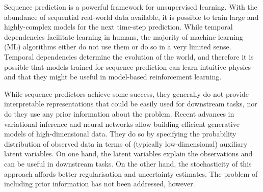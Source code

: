 %
    
    Sequence prediction is a powerful framework for unsupervised learning. With the abundance of sequential real-world data available, it is possible to train large and highly-complex models for the next time-step prediction. While temporal dependencies facilitate learning in humans, the majority of machine learning (ML) algorithms either do not use them or do so in a very limited sense. Temporal dependencies determine the evolution of the world, and therefore it is possible that models trained for sequence prediction can learn intuitive physics and that they might be useful in model-based reinforcement learning.
    
    While sequence predictors achieve some success, they generally do not provide interpretable representations that could be easily used for downstream tasks, nor do they use any prior information about the problem. Recent advances in variational inference and neural networks allow building efficient generative models of high-dimensional data. They do so by specifying the probability distribution of observed data in terms of (typically low-dimensional) auxiliary latent variables. On one hand, the latent variables explain the observations and can be useful in downstream tasks. On the other hand, the stochasticity of this approach affords better regularisation and uncertainty estimates. The problem of including prior information has not been addressed, however.
    
